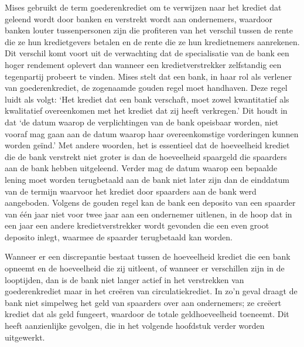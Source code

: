 Mises gebruikt de term goederenkrediet om te verwijzen naar het krediet dat geleend wordt door banken en verstrekt wordt aan ondernemers, waardoor banken louter tussenpersonen zijn die profiteren van het verschil tussen de rente die ze hun kredietgevers betalen en de rente die ze hun kredietnemers aanrekenen. Dit verschil komt voort uit de verwachting dat de specialisatie van de bank een hoger rendement oplevert dan wanneer een kredietverstrekker zelfstandig een tegenpartij probeert te vinden. Mises stelt dat een bank, in haar rol als verlener van goederenkrediet, de zogenaamde \textquotesingle gouden regel\textquotesingle{} moet handhaven. Deze regel luidt als volgt: `Het krediet dat een bank verschaft, moet zowel kwantitatief als kwalitatief overeenkomen met het krediet dat zij heeft verkregen.' Dit houdt in dat `de datum waarop de verplichtingen van de bank opeisbaar worden, niet vooraf mag gaan aan de datum waarop haar overeenkomstige vorderingen kunnen worden geïnd.'\autocite{157} Met andere woorden, het is essentieel dat de hoeveelheid krediet die de bank verstrekt niet groter is dan de hoeveelheid spaargeld die spaarders aan de bank hebben uitgeleend. Verder mag de datum waarop een bepaalde lening moet worden terugbetaald aan de bank niet later zijn dan de einddatum van de termijn waarvoor het krediet door spaarders aan de bank werd aangeboden. Volgens de gouden regel kan de bank een deposito van een spaarder van één jaar niet voor twee jaar aan een ondernemer uitlenen, in de hoop dat in een jaar een andere kredietverstrekker wordt gevonden die een even groot deposito inlegt, waarmee de spaarder terugbetaald kan worden.

Wanneer er een discrepantie bestaat tussen de hoeveelheid krediet die een bank opneemt en de hoeveelheid die zij uitleent, of wanneer er verschillen zijn in de looptijden, dan is de bank niet langer actief in het verstrekken van goederenkrediet maar in het creëren van circulatiekrediet. In zo'n geval draagt de bank niet simpelweg het geld van spaarders over aan ondernemers; ze creëert krediet dat als geld fungeert, waardoor de totale geldhoeveelheid toeneemt. Dit heeft aanzienlijke gevolgen, die in het volgende hoofdstuk verder worden uitgewerkt.


